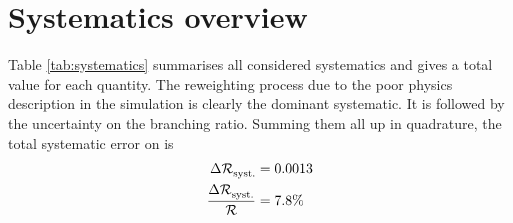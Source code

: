 \section{Systematics overview}
Table \ref{tab:systematics} summarises all considered systematics and gives a total value for each quantity.
The reweighting process due to the poor physics description in the simulation is clearly the dominant systematic.
It is followed by the uncertainty on the \LcTopKpi branching ratio.
Summing them all up in quadrature, the total systematic error on \R is
\begin{align*}
    \Delta{\ensuremath{\mathcal{R}}}^{\text{{}}}_{\text{syst.}} &= 0.0013 \\
    \frac{\Delta{\ensuremath{\mathcal{R}}}^{\text{{}}}_{\text{syst.}}}{\mathcal{R}} &= 7.8\% 
\end{align*}

